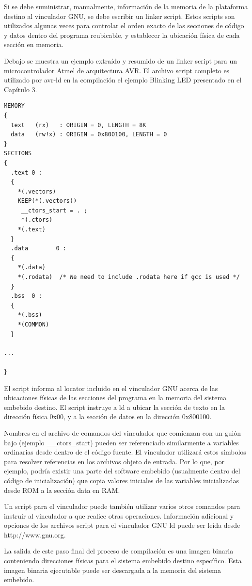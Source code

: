\documentclass[12pt]{article}
\begin{document}
Si se debe suministrar, manualmente, información de la memoria de la plataforma destino
al vinculador  GNU, se debe escribir un linker script.
Estos scripts son utilizados algunas veces para controlar el orden exacto de
las secciones de código y datos dentro del programa reubicable, y establecer
la ubicación física de cada sección en memoria.


Debajo se muestra un ejemplo extraído y resumido de un linker script
para un microcontrolador Atmel de arquitectura AVR. El archivo script
completo es utilizado por avr-ld en la compilación el ejemplo Blinking LED
presentado en el Capítulo 3.

\begin{verbatim}
MEMORY
{
  text   (rx)   : ORIGIN = 0, LENGTH = 8K
  data   (rw!x) : ORIGIN = 0x800100, LENGTH = 0
}
SECTIONS
{
  .text 0 :
  {
    *(.vectors)
    KEEP(*(.vectors))
     __ctors_start = . ;
     *(.ctors)
    *(.text)
  }
  .data        0 :
  {
    *(.data)
    *(.rodata)  /* We need to include .rodata here if gcc is used */
  }
  .bss  0 :
  {
    *(.bss)
    *(COMMON)
  }

...

}
\end{verbatim}

El script informa al locator incluido en el vinculador GNU acerca de las ubicaciones
físicas de las secciones del programa en la memoria del sistema embebido destino.
El script instruye a ld a ubicar la sección de texto en la dirección física 0x00,
y a la sección de datos en la dirección 0x800100.

Nombres en el archivo de comandos del vinculador que comienzan con un guión bajo
(ejemplo \_\_ctors\_start) pueden ser referenciado similarmente a variables ordinarias
desde dentro de el código fuente. El vinculador utilizará estos símbolos
para resolver referencias en los archivos objeto de entrada.
Por lo que, por ejemplo, podría existir una parte del software embebido (usualmente
dentro del código de inicialización) que copia valores iniciales de las variables
inicializadas desde ROM a la sección data en RAM.

Un script para el vinculador puede también utilizar varios otros comandos
para instruir al vinculador a que realice otras operaciones.
Información adicional y opciones de los archivos script para el vinculador GNU ld
puede ser leída desde http://www.gnu.org.

La salida de este paso final del proceso de compilación es una imagen binaria
conteniendo direcciones físicas para el sistema embebido destino específico.
Esta imagen binaria ejecutable puede ser descargada a la memoria del sistema embebido.
\end{document}
